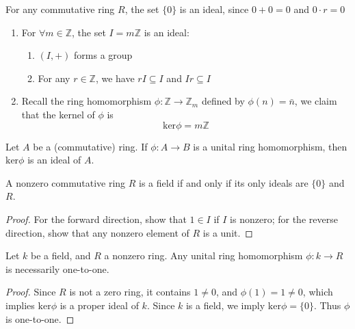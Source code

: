  \begin{example}
For any commutative ring $R$, the set $\{0\}$ is an ideal, since $0+0=0$ and $0\cdot r=0$
 \end{example}
\begin{example}
\begin{enumerate}
\item
For $\forall m\in\mathbb{Z}$, the set $I=m\mathbb{Z}$ is an ideal:
\begin{enumerate}
\item
$(I,+)$ forms a group
\item
For any $r\in\mathbb{Z}$, we have $rI\subseteq I$ and $Ir\subseteq I$
\end{enumerate}
\item
Recall the ring homomorphism $\phi:\mathbb{Z}\to\mathbb{Z}_m$ defined by $\phi(n)=\bar n$, we claim that the kernel of $\phi$ is
\[
\mbox{ker}\phi=m\mathbb{Z}
\]
\end{enumerate}
\end{example}
\begin{proposition}
Let $A$ be a (commutative) ring. If $\phi: A\to B$ is a unital ring homomorphism, then $\mbox{ker}\phi$ is an ideal of $A$.
\end{proposition}
\begin{proposition}
A nonzero commutative ring $R$ is a field if and only if its only ideals are $\{0\}$ and $R$.
\end{proposition}
\begin{proof}
For the forward direction, show that $1\in I$ if $I$ is nonzero; for the reverse direction, show that any nonzero element of $R$ is a unit.
\end{proof}
\begin{proposition}
Let $k$ be a field, and $R$ a nonzero ring. Any unital ring homomorphism $\phi:k\to R$ is necessarily one-to-one.
\end{proposition}
\begin{proof}
Since $R$ is not a zero ring, it contains $1\ne0$, and $\phi(1)=1\ne0$, which implies $\mbox{ker}\phi$ is a proper ideal of $k$. Since $k$ is a field, we imply $\mbox{ker}\phi=\{0\}$. Thus $\phi$ is one-to-one.
\end{proof}

















